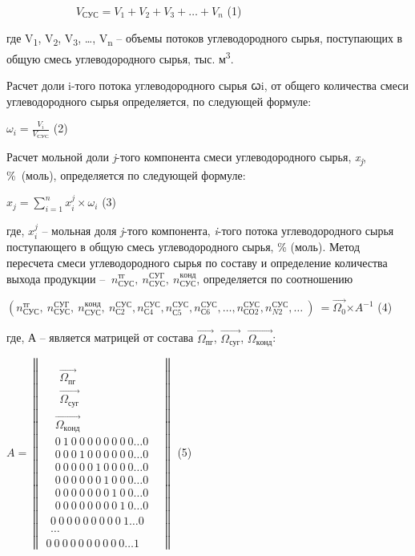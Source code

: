 \(\ \ \ \ \ \ \ \ \ \ \ \ \ \ \ \ \ \ \ \ \ \ \ \ \ \ \ \ V_{СУС} = V_{1} + V_{2} + V_{3} + \ldots + V_{n}\)
(1)

где V\textsubscript{1}, V\textsubscript{2}, V\textsubscript{3}, \ldots,
V\textsubscript{n} -- объемы потоков углеводородного сырья, поступающих
в общую смесь углеводородного сырья, тыс. м\textsuperscript{3}.

Расчет доли i-того потока углеводородного сырья ꞷi, от общего количества
смеси углеводородного сырья определяется, по следующей формуле:

\(\omega_{i} = \frac{V_{i}}{V_{СУС}}\) (2)

Расчет мольной доли \emph{j}-того компонента смеси углеводородного
сырья, \emph{x\textsubscript{j}}, \%~(моль), определяется по следующей
формуле:

\(x_{j} = \sum_{i = 1}^{n}{x_{i}^{j} \times \omega_{i}}\) (3)

где, \(x_{i}^{j}\) -- мольная доля \emph{j}-того компонента,
\emph{i}-того потока углеводородного сырья поступающего в общую смесь
углеводородного сырья, \% (моль). Метод пересчета смеси углеводородного
сырья по составу и определение количества выхода продукции --
\({\ n}_{СУС}^{тг},{\ n}_{СУС}^{СУГ},{\ n}_{СУС}^{конд}\), определяется
по соотношению

\(\left( n_{СУС}^{тг},\ n_{СУС}^{СУГ},\ n_{СУС}^{конд},\ n_{С2}^{СУС},n_{С4}^{СУС},n_{С5}^{СУС},n_{С6}^{СУС},\ldots,n_{СО2}^{СУС},n_{N2}^{СУС},\ldots\  \right)\  = \overrightarrow{\Omega_{0}}{\times A}^{- 1}\)
(4)

где, А -- является матрицей от состава \(\overrightarrow{\Omega_{пг}}\),
\(\overrightarrow{\Omega_{суг}}\), \(\overrightarrow{\Omega_{конд}}\):

\(A = \left\| \begin{array}{r}
\begin{array}{r}
\begin{array}{r}
\begin{array}{r}
\overrightarrow{\Omega_{пг}} \\
\overrightarrow{\Omega_{суг}}
\end{array} \\
\overrightarrow{\Omega_{конд}} \\
0\ 1\ 0\ 0\ 0\ 0\ 0\ 0\ 0\ 0\ldots 0 \\
0\ 0\ 0\ 1\ 0\ 0\ 0\ 0\ 0\ 0\ldots 0 \\
0\ 0\ 0\ 0\ 0\ 1\ 0\ 0\ 0\ 0\ldots 0 \\
0\ 0\ 0\ 0\ 0\ 0\ 1\ 0\ 0\ 0\ldots 0 \\
0\ 0\ 0\ 0\ 0\ 0\ 0\ 1\ 0\ 0\ldots 0 \\
0\ 0\ 0\ 0\ 0\ 0\ 0\ 0\ 1\ 0\ldots 0
\end{array} \\
0\ 0\ 0\ 0\ 0\ 0\ 0\ 0\ 0\ 1\ldots 0 \\
\ldots
\end{array} \\
0\ 0\ 0\ 0\ 0\ 0\ 0\ 0\ 0\ 0\ldots 1
\end{array} \right\|\) (5)

